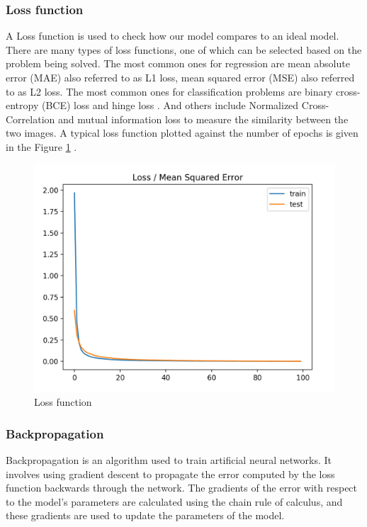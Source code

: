 \documentclass{book}
\begin{document}
	\subsubsection{Loss function}
	
	A Loss function is used to check how our model compares to an ideal model. There are many types of loss functions, one of which can be selected based on the problem being solved. The most common ones for regression are mean absolute error (MAE) also referred to as L1 loss, mean squared error (MSE) also referred to as L2 loss. The most common ones for classification problems are binary cross-entropy (BCE) loss and hinge loss \cite{wang2020comprehensive}. And others include Normalized Cross-Correlation and mutual information loss to measure the similarity between the two images. A typical loss function plotted against the number of epochs is given in the Figure \ref{fig:LossFun} \cite{image2023mse}. 
	
	\begin{figure}[h!]
		\centering
		\includegraphics[scale=0.2]{resources/chapter3/lossfun.png}
		\caption{Loss function}
		\label{fig:LossFun}
	\end{figure}
	
	\subsubsection{Backpropagation}
	
	Backpropagation is an algorithm used to train artificial neural networks. It involves using gradient descent to propagate the error computed by the loss function backwards through the network. The gradients of the error with respect to the model's parameters are calculated using the chain rule of calculus, and these gradients are used to update the parameters of the model.
	
\end{document}
